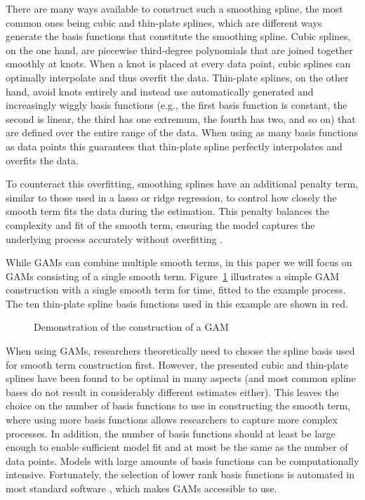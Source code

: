 \documentclass[man, floatsintext]{apa7}
\begin{document}
There are many ways available to construct such a smoothing spline, the most
common ones being cubic and thin-plate splines, which are different ways
generate the basis functions that constitute the smoothing spline. Cubic
splines, on the one hand, are piecewise third-degree polynomials that are
joined together smoothly at knots. When a knot is placed at every data point,
cubic splines can optimally interpolate and thus overfit the data. Thin-plate
splines, on the other hand, avoid knots entirely and instead use automatically
generated and increasingly wiggly basis functions (e.g., the first basis
function is constant, the second is linear, the third has one extremum, the
fourth has two, and so on) that are defined over the entire range of the data.
When using as many basis functions as data points this guarantees that
thin-plate spline perfectly interpolates and overfits the data.

To counteract
this overfitting, smoothing splines have an additional penalty term, similar to
those used in a lasso or ridge regression, to control how closely the smooth
term fits the data during the estimation. This penalty balances the complexity
and fit of the smooth term, ensuring the model captures the underlying process
accurately without overfitting \parencite{gu_smoothing_2013,
  wahba_spline_1980}.

While GAMs can combine multiple smooth terms, in this paper we will focus on
GAMs consisting of a single smooth term. Figure~\ref{fig:gam_dem} illustrates a
simple GAM construction with a single smooth term for time, fitted to the
example process. The ten thin-plate spline basis functions used in this example
are shown in red.

\begin{figure}[!t]
  \caption{Demonstration of the construction of a GAM}
  \label{fig:gam_dem}
\end{figure}

When using GAMs, researchers theoretically need to choose the spline basis used
for smooth term construction first. However, the presented cubic and thin-plate
splines have been found to be optimal in many aspects (and most common spline
bases do not result in considerably different estimates either). This leaves
the choice on the number of basis functions to use in constructing the smooth
term, where using more basis functions allows researchers to capture more
complex processes. In addition, the number of basis functions should at least
be large enough to enable sufficient model fit and at most be the same as the
number of data points. Models with large amounts of basis functions can be
computationally intensive. Fortunately, the selection of lower rank basis
functions is automated in most standard software \parencite{R-mgcv_a}, which
makes GAMs accessible to use.
\end{document}
